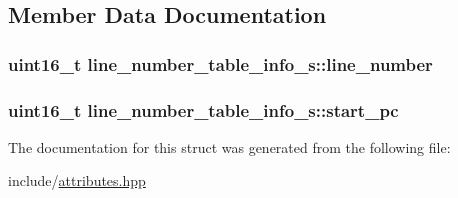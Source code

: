 \subsection{Member Data Documentation}
\hypertarget{structline__number__table__info__s_ad953dc84b13bcebcee8b877afc6fdcab}{
\subsubsection[{line\+\_\+number}]{\setlength{\rightskip}{0pt plus 5cm}uint16\+\_\+t line\+\_\+number\+\_\+table\+\_\+info\+\_\+s\+::line\+\_\+number}}\label{structline__number__table__info__s_ad953dc84b13bcebcee8b877afc6fdcab}
\hypertarget{structline__number__table__info__s_ac18154b426adb423127cd7f09c037424}{
\subsubsection[{start\+\_\+pc}]{\setlength{\rightskip}{0pt plus 5cm}uint16\+\_\+t line\+\_\+number\+\_\+table\+\_\+info\+\_\+s\+::start\+\_\+pc}}\label{structline__number__table__info__s_ac18154b426adb423127cd7f09c037424}


The documentation for this struct was generated from the following file\+:\begin{DoxyCompactItemize}
\item 
include/\hyperlink{attributes_8hpp}{attributes.\+hpp}\end{DoxyCompactItemize}
